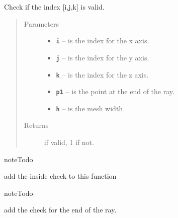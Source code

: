 \documentclass[letterpaper,10pt,english]{sphinxmanual}
\begin{document}
\begin{fulllineitems}
\begin{fulllineitems}
\begin{quote}
\begin{description}
\end{description}\end{quote}

\end{fulllineitems}


\begin{fulllineitems}
\label{index:DictionarySparseMatrix.DS.stopcheck}
Check if the index {[}i,j,k{]} is valid.
\begin{quote}\begin{description}
\item[{Parameters}] \leavevmode\begin{itemize}
\item {} 
\textbf{\texttt{i}} -- is the index for the x axis.

\item {} 
\textbf{\texttt{j}} -- is the index for the y axis.

\item {} 
\textbf{\texttt{k}} -- is the index for the z axis.

\item {} 
\textbf{\texttt{p1}} -- is the point at the end of the ray.

\item {} 
\textbf{\texttt{h}} -- is the mesh width

\end{itemize}

\item[{Returns}]  if valid, 1 if not.

\end{description}\end{quote}

\begin{notice}{note}{Todo}

add the inside check to this function
\end{notice}

\begin{notice}{note}{Todo}

add the check for the end of the ray.
\end{notice}

\end{fulllineitems}



\end{fulllineitems}
\end{document}
